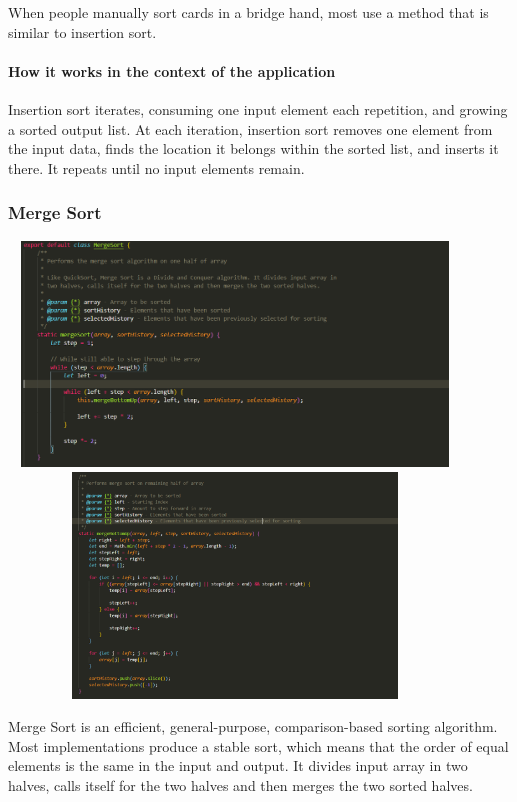 When people manually sort cards in a bridge hand, most use a method that is similar to insertion sort.

\paragraph{How it works in the context of the application}
Insertion sort iterates, consuming one input element each repetition, and growing a sorted output list. At each iteration, insertion sort removes one element from the input data, finds the location it belongs within the sorted list, and inserts it there. It repeats until no input elements remain.

\subsubsection{Merge Sort}
\begin{center}
    \includegraphics[width=12cm,height=6cm,keepaspectratio]{images/mergesort1}
    \includegraphics[width=12cm,height=6cm,keepaspectratio]{images/mergesort2}
\end{center}
Merge Sort is an efficient, general-purpose, comparison-based sorting algorithm. Most implementations produce a stable sort, which means that the order of equal elements is the same in the input and output. It divides input array in two halves, calls itself for the two halves and then merges the two sorted halves.


